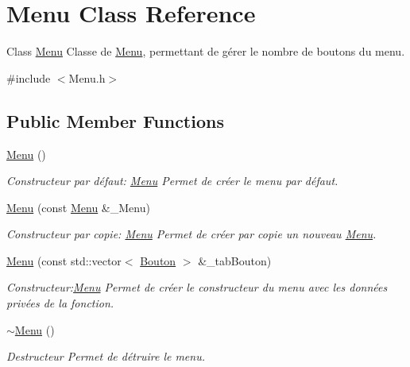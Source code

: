 \hypertarget{classMenu}{}\section{Menu Class Reference}
\label{classMenu}


Class \hyperlink{classMenu}{Menu} Classe de \hyperlink{classMenu}{Menu}, permettant de gérer le nombre de boutons du menu.  




{\ttfamily \#include $<$Menu.\+h$>$}

\subsection*{Public Member Functions}
\begin{DoxyCompactItemize}
\item 
\hyperlink{classMenu_ad466dd83355124a6ed958430450bfe94}{Menu} ()
\begin{DoxyCompactList}\small\item\em Constructeur par défaut\+: \hyperlink{classMenu}{Menu} Permet de créer le menu par défaut. \end{DoxyCompactList}\item 
\hyperlink{classMenu_a255104f828234493ca62a43d144d2573}{Menu} (const \hyperlink{classMenu}{Menu} \&\+\_\+\+Menu)
\begin{DoxyCompactList}\small\item\em Constructeur par copie\+: \hyperlink{classMenu}{Menu} Permet de créer par copie un nouveau \hyperlink{classMenu}{Menu}. \end{DoxyCompactList}\item 
\hyperlink{classMenu_a51e725eafe16d272ea48c377a1d3aeff}{Menu} (const std\+::vector$<$ \hyperlink{classBouton}{Bouton} $>$ \&\+\_\+tab\+Bouton)
\begin{DoxyCompactList}\small\item\em Constructeur\+:\hyperlink{classMenu}{Menu} Permet de créer le constructeur du menu avec les données privées de la fonction. \end{DoxyCompactList}\item 
\mbox{\label{classMenu_a831387f51358cfb88cd018e1777bc980}} 
\hyperlink{classMenu_a831387f51358cfb88cd018e1777bc980}{$\sim$\+Menu} ()
\begin{DoxyCompactList}\small\item\em Destructeur Permet de détruire le menu. \end{DoxyCompactList}\item 

\end{DoxyCompactItemize}
